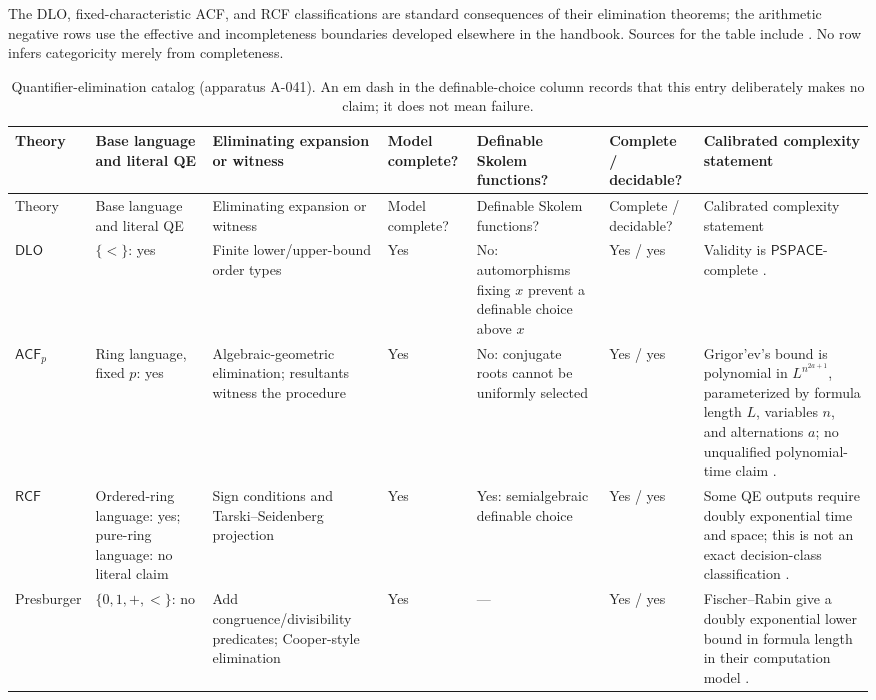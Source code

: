 The DLO, fixed-characteristic ACF, and RCF classifications are standard
consequences of their elimination theorems; the arithmetic negative rows use
the effective and incompleteness boundaries developed elsewhere in the
handbook.  Sources for the table include
  \cite{Marker2002,Steinitz1910,Hodges1993,Presburger1929,Shoenfield1967,Godel1931,
FerranteRackoff1979,Kozen1980}.  No row infers categoricity merely from
completeness.

\begin{landscape}
\begingroup\tiny\setlength{\tabcolsep}{2pt}
\begin{longtable}{@{}p{.65in}p{1.10in}p{1.20in}p{.60in}p{.70in}p{.80in}p{2.10in}@{}}
\caption{Quantifier-elimination catalog (apparatus A-041).  An em dash in the
definable-choice column records that this entry deliberately makes no claim;
it does not mean failure.}
\label{tab:p03-qe-catalog}\\
\toprule
Theory & Base language and literal QE & Eliminating expansion or witness & Model complete? & Definable Skolem functions? & Complete / decidable? & Calibrated complexity statement \\
\midrule\endfirsthead
\toprule
Theory & Base language and literal QE & Eliminating expansion or witness & Model complete? & Definable Skolem functions? & Complete / decidable? & Calibrated complexity statement \\
\midrule\endhead
\(\mathsf{DLO}\) & \(\{<\}\): yes & Finite lower/upper-bound order types & Yes & No: automorphisms fixing \(x\) prevent a definable choice above \(x\) & Yes / yes & Validity is \(\mathsf{PSPACE}\)-complete \cite{Kozen2006}. \\
\addlinespace
\(\mathsf{ACF}_p\) & Ring language, fixed \(p\): yes & Algebraic-geometric elimination; resultants witness the procedure & Yes & No: conjugate roots cannot be uniformly selected & Yes / yes & Grigor'ev's bound is polynomial in \(L^{n^{2a+1}}\), parameterized by formula length \(L\), variables \(n\), and alternations \(a\); no unqualified polynomial-time claim \cite{Grigoriev1987}. \\
\addlinespace
\(\mathsf{RCF}\) & Ordered-ring language: yes; pure-ring language: no literal claim & Sign conditions and Tarski--Seidenberg projection & Yes & Yes: semialgebraic definable choice & Yes / yes & Some QE outputs require doubly exponential time and space; this is not an exact decision-class classification \cite{DavenportHeintz1988}. \\
\addlinespace
Presburger & \(\{0,1,+,<\}\): no & Add congruence/divisibility predicates; Cooper-style elimination & Yes & --- & Yes / yes & Fischer--Rabin give a doubly exponential lower bound in formula length in their computation model \cite{FischerRabin1974}. \\

\end{longtable}
\end{landscape}
